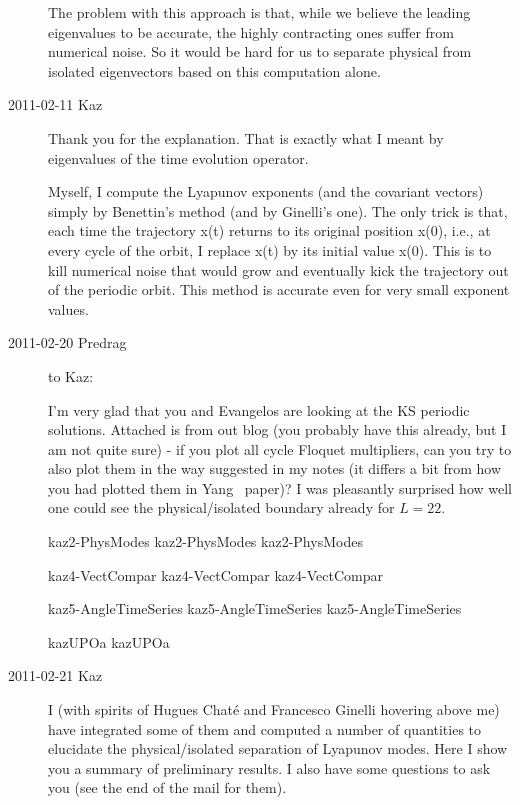 \begin{description}
The problem with this approach is that, while we believe the leading
eigenvalues to be accurate, the highly contracting ones suffer from
numerical noise. So it would be hard for us to separate physical from
isolated eigenvectors based on this computation alone.

\item[2011-02-11 Kaz] Thank you for the explanation. That is exactly what
I meant by eigenvalues of the time evolution operator.

Myself, I compute the Lyapunov exponents (and the covariant vectors) simply
by Benettin's method (and by Ginelli's one). The only trick is that, each time
the trajectory x(t) returns to its original position x(0), i.e., at every cycle
of the orbit, I replace x(t) by its initial value x(0). This is to kill
numerical noise that would grow and eventually kick the trajectory
out of the periodic orbit. This method is accurate even for very small
exponent values.

\item[2011-02-20 Predrag] to Kaz:

I'm very glad that you and Evangelos are looking at the KS periodic solutions.
Attached is  from out blog
(you probably have this already, but
I am not quite sure) - if you plot all cycle Floquet multipliers, can you try to
also plot them in the way suggested in my notes (it differs a bit from how you
had plotted them in Yang \etal\ paper)?
I was pleasantly surprised how well one
could see the physical/isolated boundary already for $L=22$.


{kaz2-PhysModes}   %
{}   %
{    %
kaz2-PhysModes
}
{kaz2-PhysModes}   %

{kaz4-VectCompar}   %
{}   %
{    %
kaz4-VectCompar
}
{kaz4-VectCompar}   %

{kaz5-AngleTimeSeries}   %
{}   %
{    %
kaz5-AngleTimeSeries
}
{kaz5-AngleTimeSeries}   %

{}   %
{    %
kazUPOa
}
{kazUPOa}   %

\item[2011-02-21 Kaz]
I (with spirits of Hugues Chat\'e and Francesco Ginelli hovering above me)
have integrated some of
them and computed a number of quantities to elucidate the
physical/isolated separation of Lyapunov modes. Here I show you a
summary of preliminary results. I also have some questions to ask you
(see the end of the mail for them).



\end{description}
